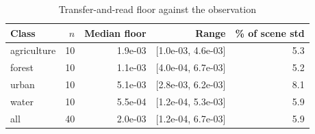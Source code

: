 \begin{table}[t]
\centering
\caption{Transfer-and-read floor against the observation}
\label{tab:representation_floor}
\footnotesize
\setlength{\tabcolsep}{3pt}
\begin{tabular}{lrrrr}
\toprule
Class & $n$ & Median floor & Range & \% of scene std \\
\midrule
agriculture & 10 & 1.9e-03 & [1.0e-03, 4.6e-03] & 5.3 \\
forest & 10 & 1.1e-03 & [4.0e-04, 6.7e-03] & 5.2 \\
urban & 10 & 5.1e-03 & [2.8e-03, 6.2e-03] & 8.1 \\
water & 10 & 5.5e-04 & [1.2e-04, 5.3e-03] & 5.9 \\
\midrule
all & 40 & 2.0e-03 & [1.2e-04, 6.7e-03] & 5.9 \\
\bottomrule
\end{tabular}
\end{table}
